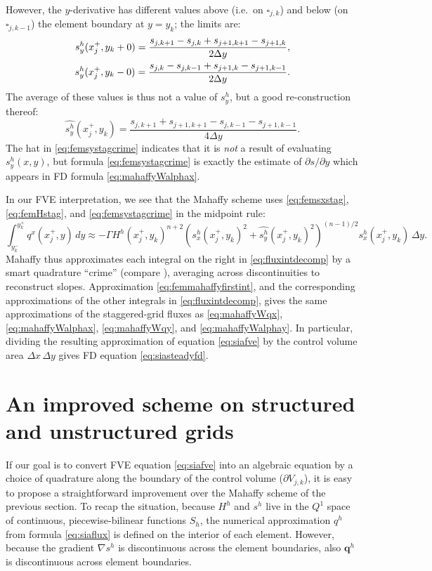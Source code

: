 \documentclass[twocolumn]{igs}
\newcommand\bq{\mathbf{q}}
\newcommand{\grad}{\nabla}
\begin{document}
However, the $y$-derivative has different values above (i.e.~on $\square_{j,k}$) and below (on $\square_{j,k-1}$) the element boundary at $y = y_k$; the limits are:
\begin{align}
s^h_y(x_j^+,y_k+0) = \frac{s_{j,k+1}-s_{j,k} + s_{j+1,k+1}-s_{j+1,k}}{2\Delta y}, \\
s^h_y(x_j^+,y_k-0) = \frac{s_{j,k}-s_{j,k-1} + s_{j+1,k}-s_{j+1,k-1}}{2\Delta y}. \notag
\end{align}
The average of these values is thus not a value of $s_y^h$, but a good re-construction thereof:
\begin{equation}
\widehat{s^h_y}(x_j^+,y_k) = \frac{s_{j,k+1} + s_{j+1,k+1} - s_{j,k-1} - s_{j+1,k-1}}{4\Delta y}. \label{eq:femsystagcrime}
\end{equation}
The hat in \eqref{eq:femsystagcrime} indicates that it is \emph{not} a result of evaluating $s^h_y(x,y)$, but formula \eqref{eq:femsystagcrime} is exactly the estimate of $\partial s/\partial y$ which appears in FD formula \eqref{eq:mahaffyWalphax}.

In our FVE interpretation, we see that the Mahaffy scheme uses \eqref{eq:femsxstag}, \eqref{eq:femHstag}, and \eqref{eq:femsystagcrime} in the midpoint rule:
\begin{equation}
\int_{y_k^-}^{y_k^+} q^x(x_j^+,y)\,dy \approx - \Gamma H^h(x_j^+,y_k)^{n+2} \left(s^h_x(x_j^+,y_k)^2 + \widehat{s^h_y}(x_j^+,y_k)^2\right)^{(n-1)/2} s^h_x(x_j^+,y_k)\,\Delta y. \label{eq:femmahaffyfirstint}
\end{equation}
Mahaffy thus approximates each integral on the right in \eqref{eq:fluxintdecomp} by a smart quadrature ``crime'' (compare \cite{Strang1972}), averaging across discontinuities to reconstruct slopes.  Approximation \eqref{eq:femmahaffyfirstint}, and the corresponding approximations of the other integrals in \eqref{eq:fluxintdecomp}, gives the same approximations of the staggered-grid fluxes as \eqref{eq:mahaffyWqx}, \eqref{eq:mahaffyWalphax}, \eqref{eq:mahaffyWqy}, and \eqref{eq:mahaffyWalphay}.  In particular, dividing the resulting approximation of equation \eqref{eq:siafve} by the control volume area $\Delta x\,\Delta y$ gives FD equation \eqref{eq:siasteadyfd}.

\section{An improved scheme on structured and unstructured grids}  \label{sec:star}

If our goal is to convert FVE equation \eqref{eq:siafve} into an algebraic equation by a choice of quadrature along the boundary of the control volume ($\partial V_{j,k}$), it is easy to propose a straightforward improvement over the Mahaffy scheme of the previous section.  To recap the situation, because $H^h$ and $s^h$ live in the $Q^1$ space of continuous, piecewise-bilinear functions $S_h$, the numerical approximation $q^h$ from formula \eqref{eq:siaflux} is defined on the interior of each element.  However, because the gradient $\grad s^h$ is discontinuous across the element boundaries, also $\bq^h$ is discontinuous across element boundaries.
\end{document}
